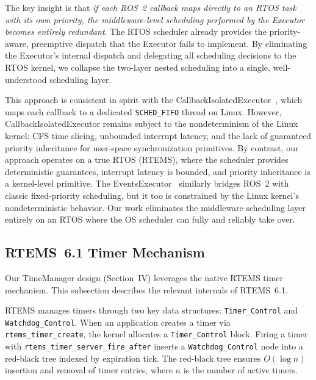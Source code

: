 The key insight is that \emph{if each ROS~2 callback maps directly to an RTOS task with its own priority, the middleware-level scheduling performed by the Executor becomes entirely redundant}.
The RTOS scheduler already provides the priority-aware, preemptive dispatch that the Executor fails to implement.
By eliminating the Executor's internal dispatch and delegating all scheduling decisions to the RTOS kernel, we collapse the two-layer nested scheduling into a single, well-understood scheduling layer.

This approach is consistent in spirit with the CallbackIsolatedExecutor~\cite{ishikawa2025rtas}, which maps each callback to a dedicated \texttt{SCHED\_FIFO} thread on Linux.
However, CallbackIsolatedExecutor remains subject to the nondeterminism of the Linux kernel: CFS time slicing, unbounded interrupt latency, and the lack of guaranteed priority inheritance for user-space synchronization primitives.
By contrast, our approach operates on a true RTOS (RTEMS), where the scheduler provides deterministic guarantees, interrupt latency is bounded, and priority inheritance is a kernel-level primitive.
The EventsExecutor~\cite{teper2024rtss} similarly bridges ROS~2 with classic fixed-priority scheduling, but it too is constrained by the Linux kernel's nondeterministic behavior.
Our work eliminates the middleware scheduling layer entirely on an RTOS where the OS scheduler can fully and reliably take over.

\subsection{RTEMS~6.1 Timer Mechanism}

Our TimeManager design (Section~IV) leverages the native RTEMS timer mechanism.
This subsection describes the relevant internals of RTEMS~6.1.

RTEMS manages timers through two key data structures: \texttt{Timer\_Control} and \texttt{Watchdog\_Control}.
When an application creates a timer via \texttt{rtems\_timer\_create}, the kernel allocates a \texttt{Timer\_Control} block.
Firing a timer with \texttt{rtems\_timer\_server\_fire\_after} inserts a \texttt{Watchdog\_Control} node into a red-black tree indexed by expiration tick.
The red-black tree ensures $O(\log n)$ insertion and removal of timer entries, where $n$ is the number of active timers.

